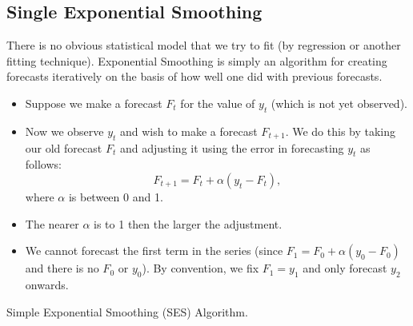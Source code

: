 \documentclass[a4paper,11pt,oneside,onecolumn]{book}
\begin{document}
\subsection{Single Exponential Smoothing}

There is no obvious statistical model that
we try to fit (by regression or another fitting technique). Exponential Smoothing is
simply an algorithm for creating forecasts iteratively on the basis
of how well one did with previous forecasts.


\begin{itemize}
\item Suppose we make a forecast $F_t$ for the value of $y_t$ (which is not yet observed).
\item Now we observe $y_t$ and wish to make a forecast $F_{t+1}$.
We do this by taking our old forecast $F_t$ and adjusting it using
the error in forecasting $y_t$ as follows:
\[ F_{t+1} = F_t + \alpha (y_t - F_t), \]
where $\alpha$ is between 0 and 1.
\item The nearer $\alpha$ is to 1 then the larger the adjustment.
\item We cannot forecast the first term in the series (since $F_1
= F_0 + \alpha (y_0 - F_0)$ and there is no $F_0$ or $y_0$). By
convention, we fix $F_1 = y_1$ and only forecast $y_2$ onwards.
\end{itemize}

\begin{table}[!h]
\begin{center}
\caption{Simple Exponential Smoothing  (SES) Algorithm.}
 \end{center}
\end{table}




\end{document}
